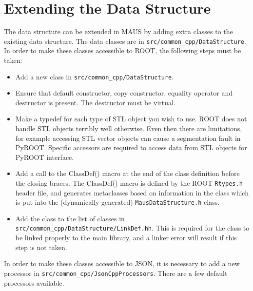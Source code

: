 \section{Extending the Data Structure}
The data structure can be extended in MAUS by adding extra classes to the existing data structure. The data classes are in \verb|src/common_cpp/DataStructure|. In order to make these classes accessible to ROOT, the following steps must be taken:
\begin{itemize}
\item Add a new class in \verb|src/common_cpp/DataStructure|.
\item Ensure that default constructor, copy constructor, equality operator and destructor is present. The destructor must be virtual.
\item Make a typedef for each type of STL object you wish to use. ROOT does not handle STL objects terribly well otherwise. Even then there are limitations, for example accessing STL vector objects can cause a segmentation fault in PyROOT. Specific accessors are required to access data from STL objects for PyROOT interface.
\item Add a call to the ClassDef() macro at the end of the class definition before the closing braces. The ClassDef() macro is defined by the ROOT \verb|Rtypes.h| header file, and generates metaclasses based on information in the class which is put into the (dynamically generated) \verb|MausDataStructure.h| class.
\item Add the class to the list of classes in \verb|src/common_cpp/DataStructure/LinkDef.hh|. This is required for the class to be linked properly to the main library, and a linker error will result if this step is not taken.
\end{itemize}
In order to make these classes accessible to JSON, it is necessary to add a new processor in \verb|src/common_cpp/JsonCppProcessors|. There are a few default processors available.
